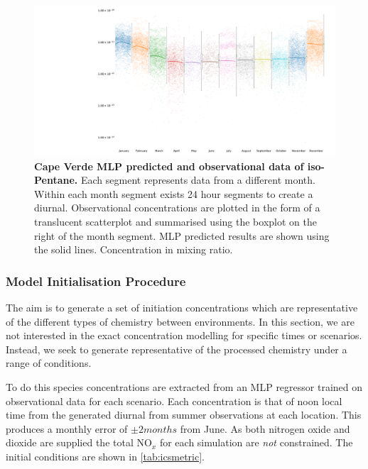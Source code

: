 \begin{figure}[H]
     \centering
         \includegraphics[width=.90\textheight,angle =90,trim={8cm 0 0 0}]{figures_c3/mlpregressor/CVNOX_CapeVerde/ISO_PENTANE.pdf}
        \caption{\textbf{Cape Verde MLP predicted and observational data of iso-Pentane.} Each segment represents data from a different month. Within each month segment exists 24 hour segments to create a diurnal. Observational concentrations are plotted in the form of a translucent scatterplot and summarised using the boxplot on the right of the month segment. MLP predicted results are shown using the solid lines. Concentration in mixing ratio. }
        \label{fig:mlpisopentane}
\end{figure}


\subsubsection{Model Initialisation Procedure}
The aim is to generate a set of initiation concentrations which are representative of the different types of chemistry between environments. In this section, we are not interested in the exact concentration modelling for specific times or scenarios. Instead, we seek to generate representative of the processed chemistry under a range of conditions. 

To do this species concentrations are extracted from an MLP regressor trained on observational data for each scenario. Each concentration is that of noon local time from the generated diurnal from summer observations at each location. This produces a monthly error of $\pm 2 months$ from June. As both nitrogen oxide and dioxide are supplied the total NO$_x$ for each simulation are \emph{not} constrained. The initial conditions are shown in \autoref{tab:icsmetric}.

